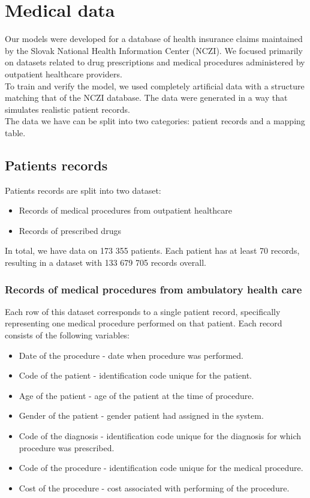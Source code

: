 
\chapter{Medical data} \label{chap:data}

Our models were developed for a database of health insurance claims maintained by the Slovak National Health Information Center (NCZI). We focused primarily on datasets related to drug prescriptions and medical procedures administered by outpatient healthcare providers.
\\

To train and verify the model, we used completely artificial data with a structure matching that of the NCZI database. The data were generated in a way that simulates realistic patient records.
\\

The data we have can be split into two categories: patient records and a mapping table.

\section{Patients records}

Patients records are split into two dataset:
\begin{itemize}
	\item Records of medical procedures from outpatient healthcare
	\item Records of prescribed drugs
\end{itemize}

In total, we have data on 173 355 patients. Each patient has at least 70 records, resulting in a dataset with 133 679 705 records overall. 

\subsection{Records of medical procedures from ambulatory health care}

Each row of this dataset corresponds to a single patient record, specifically representing one medical procedure performed on that patient. Each record consists of the following variables:

\begin{itemize}
	\item Date of the procedure - date when procedure was performed.
	\item Code of the patient - identification code unique for the patient.
	\item Age of the patient - age of the patient at the time of procedure.
	\item Gender of the patient - gender patient had assigned in the system.
	\item Code of the diagnosis - identification code unique for the diagnosis for which procedure was prescribed.
	\item Code of the procedure - identification code unique for the medical procedure.
	\item Cost of the procedure - cost associated with performing of the procedure.
\end{itemize}

